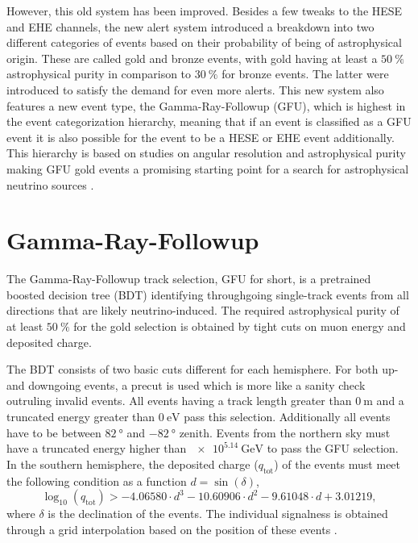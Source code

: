 However, this old system has been improved.
Besides a few tweaks to the HESE and EHE channels, the new alert system introduced a breakdown into two different categories of events based on their probability of being of astrophysical origin.
These are called gold and bronze events, with gold having at least a $\SI{50}{\percent}$ astrophysical purity in comparison to $\SI{30}{\percent}$ for bronze events.
The latter were introduced to satisfy the demand for even more alerts.
This new system also features a new event type, the Gamma-Ray-Followup (GFU), which is highest in the event categorization hierarchy, meaning that if an event is classified as a GFU event it is also possible for the event to be a HESE or EHE event additionally.
This hierarchy is based on studies on angular resolution and astrophysical purity making GFU gold events a promising starting point for a search for astrophysical neutrino sources \cite{Aartsen_2017}.

\section{Gamma-Ray-Followup}

The Gamma-Ray-Followup track selection, GFU for short, is a pretrained boosted decision tree (BDT) identifying throughgoing single-track events from all directions that are likely neutrino-induced.
The required astrophysical purity of at least $\SI{50}{\percent}$ for the gold selection is obtained by tight cuts on muon energy and deposited charge.

The BDT consists of two basic cuts different for each hemisphere.
For both up- and downgoing events, a precut is used which is more like a sanity check outruling invalid events.
All events having a track length greater than $\SI{0}{\meter}$ and a truncated energy greater than $\SI{0}{\electronvolt}$ pass this selection.
Additionally all events have to be between $\SI{82}{\degree}$ and $\SI{-82}{\degree}$ zenith.
Events from the northern sky must have a truncated energy higher than $\SI{e5.14}{\giga\electronvolt}$ to pass the GFU selection.
In the southern hemisphere, the deposited charge ($q_\text{tot}$) of the events must meet the following condition as a function $d=\sin{(\delta)}$,
\begin{equation}
  \log_{10}(q_\text{tot}) > -4.06580\cdot d^3 - 10.60906\cdot d^2  -9.61048\cdot d + 3.01219,
\end{equation}
where $\delta$ is the declination of the events.
The individual signalness is obtained through a grid interpolation based on the position of these events \cite{track_alert_paper}.

